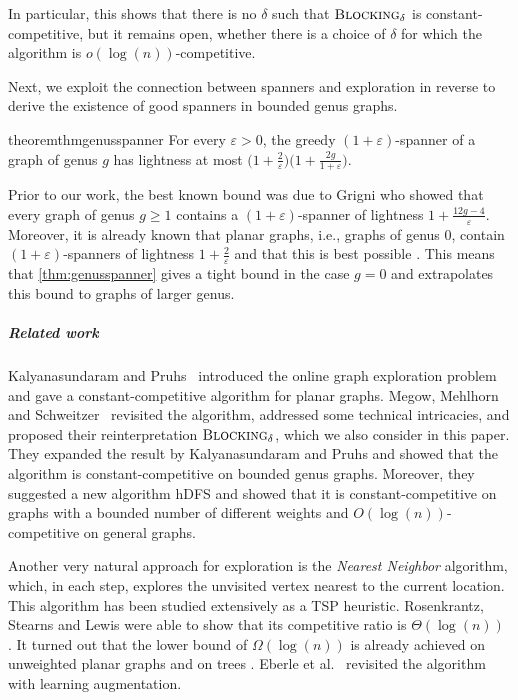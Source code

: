 \documentclass[a4paper,cleveref, autoref, thm-restate, thm-restate, UKenglish]{lipics-v2021}
\newcommand{\blocking}{\textsc{Blocking}}
\renewcommand{\epsilon}{\varepsilon}
\begin{document}
In particular, this shows that there is no $\delta$ such that $ \blocking_\delta$ is constant-competitive, but it remains open, whether there is a choice of $\delta$ for which the algorithm is $o(\log (n))$-competitive.

Next, we exploit the connection between spanners and exploration in reverse to derive the existence of good spanners in bounded genus graphs.

\setcounter{restatecounter}{\value{definition}}


\begin{restatable}{theorem}{thmgenusspanner}\label{thm:genusspanner}
For every $\epsilon>0$, the greedy $(1+\epsilon)$-spanner of a graph of genus $g$ has lightness at most $\bigl( 1+\frac{2}{\epsilon} \bigl) \bigl(1+\frac{2g}{1+\epsilon} \bigl)$.
\end{restatable}

Prior to our work, the best known bound was due to Grigni \cite{grigni} who showed that every graph of genus $g\geq 1$ contains a $(1+\epsilon)$-spanner of lightness $1+ \frac{12g-4}{\epsilon}$. Moreover,
it is already known that planar graphs, i.e., graphs of genus 0, contain $(1+\epsilon)$-spanners of lightness $1+\frac{2}{\epsilon}$ and that this is best possible \cite{althoefer}. This means that \cref{thm:genusspanner} gives a tight bound in the case $g=0$ and extrapolates this bound to graphs of larger genus.


\subparagraph*{Related work}
Kalyanasundaram and Pruhs~\cite{pruhs94} introduced the online graph exploration problem and gave a constant-competitive algorithm for planar graphs. 
Megow, Mehlhorn and Schweitzer~\cite{megow} revisited the algorithm, addressed some technical intricacies, and proposed their reinterpretation $\blocking_\delta$, which we also consider in this paper. 
They expanded the result by  Kalyanasundaram and Pruhs and showed that the algorithm is constant-competitive on bounded genus graphs. Moreover, they suggested a new algorithm hDFS and showed that it is constant-competitive on graphs with a bounded number of different weights and $O(\log (n))$-competitive on general graphs.

Another very natural approach for exploration is the \emph{Nearest Neighbor} algorithm, which, in each step, explores the unvisited vertex nearest to the current location. This algorithm has been studied extensively as a TSP heuristic. Rosenkrantz, Stearns and Lewis were able to show that its competitive ratio is $\Theta(\log (n))$ \cite{NN}. It turned out that the lower bound of $\Omega(\log (n))$ is already achieved on unweighted planar graphs \cite{hurkens} and on trees \cite{fritsch}.
Eberle et al.~\cite{eberle} revisited the algorithm with learning augmentation.
\end{document}
